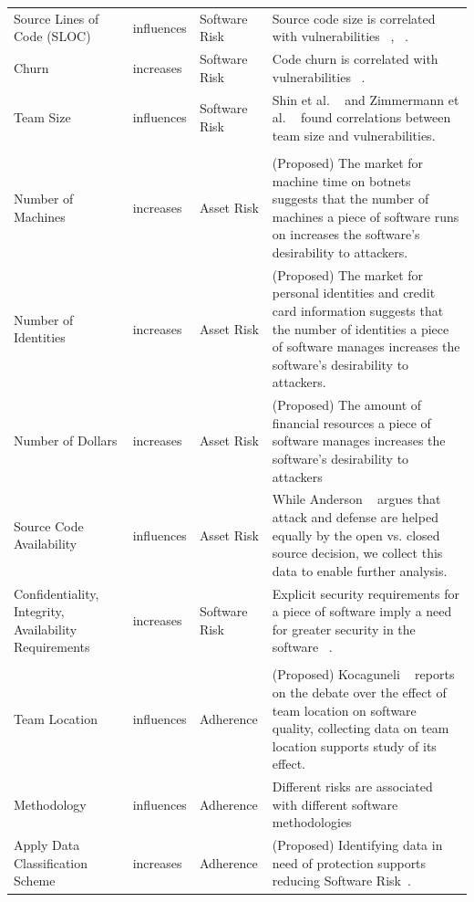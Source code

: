 \begin{table}[!htbp]
\begin{small}
\begin{tabular}{@{\extracolsep{5pt}}p{3cm}p{1cm}p{2cm}p{10cm}}
			Source Lines of Code (SLOC)	& influences	& Software Risk & Source code size is correlated with vulnerabilities ~\cite{shin2011evaluating}, ~\cite{alhazmi2007measuring}. \\
			Churn &	increases &	Software Risk  &  Code churn is correlated with vulnerabilities ~\cite{shin2011evaluating}.\\
			Team Size	& influences	& Software Risk & Shin et al. ~\cite{shin2011evaluating} and Zimmermann et al. ~\cite{zimmerman2010searching} found correlations between team size and vulnerabilities. \\			
			\hline \\[-1.8ex] 
			Number of Machines &	increases &	Asset Risk & (Proposed) The market for machine time on botnets suggests that the number of machines a piece of software runs on increases the software's desirability to attackers. \\
			Number of Identities &	increases &	Asset Risk	 &  (Proposed) The market for personal identities and credit card information suggests that the number of identities a piece of software manages increases the software's desirability to attackers.\\
			Number of Dollars &	increases &	Asset Risk	 & (Proposed) The amount of financial resources a piece of software manages increases the software's desirability to attackers\\
			Source Code Availability	& influences &	Asset Risk & While Anderson ~\cite{anderson2002security} argues that attack and defense
			are helped equally by the open vs. closed source decision, we collect this data to enable further analysis.  \\
			Confidentiality, Integrity, Availability Requirements &	increases &	Software Risk	& Explicit security requirements for a piece of software imply a need for greater security in the software ~\cite{mell2007complete}. \\
			\hline \\[-1.8ex]
			Team Location &	influences &	Adherence	& (Proposed)  Kocaguneli ~\cite{kocaguneli2013distributed} reports on the debate over the effect of team location on software quality, collecting data on team location supports study of its effect. \\
			Methodology	& influences &	Adherence	& Different risks are associated with different software methodologies~\cite{williams2004xpef,jones2000software} \\
			Apply Data Classification Scheme & increases & 	Adherence & (Proposed) Identifying data in need of protection supports reducing Software Risk~\cite{morrison2017surveying}.\\	

\end{tabular}
\end{small}
\end{table}
